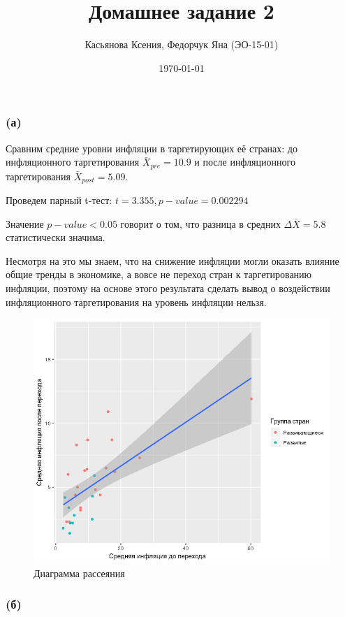 \documentclass[a4paper,12pt]{article} %
\author{Касьянова Ксения, Федорчук Яна (ЭО-15-01) }
\title{Домашнее задание 2}
\date{\today}
\begin{document}
\maketitle

\subsubsection*{(а)}	

Сравним средние уровни инфляции в таргетирующих её странах:  до инфляционного таргетирования $ \bar{X}_{pre} = 10.9 $ и после инфляционного таргетирования $ \bar{X}_{post} = 5.09$. 

Проведем парный t-тест: $ t = 3.355, p-value = 0.002294$

Значение $ p-value < 0.05 $ говорит о том, что разница в средних $ \Delta \bar{X} = 5.8 $  статистически значима.    

Несмотря на это мы знаем, что на снижение инфляции могли оказать влияние  общие тренды в экономике, а вовсе не переход стран к таргетированию инфляции, поэтому  на основе
этого результата сделать вывод о воздействии инфляционного
таргетирования на уровень инфляции нельзя.

	
\begin{figure}[h!]
	\centering
	\includegraphics[width=0.7\linewidth]{Rplot}
	\caption[Диаграмма рассеяния]{Диаграмма рассеяния}
	\label{fig:rplot1}
\end{figure}



\newpage


	
	
\subsubsection*{(б)}	
\end{document}
